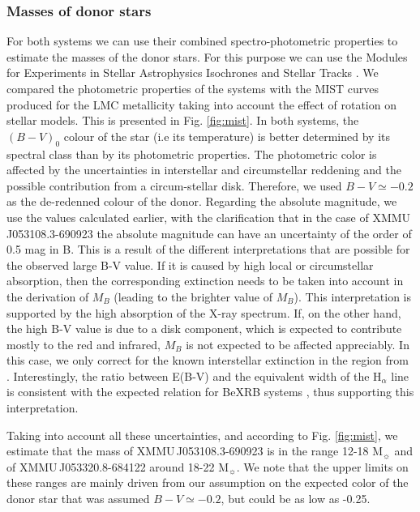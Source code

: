 \documentclass[a4paper,fleqn,usenatbib]{mnras}
\newcommand{\canda}{XMMU\,J053108.3-690923\xspace} %
\newcommand{\candb}{XMMU\,J053320.8-684122\xspace} %
\begin{document}
\subsubsection{Masses of donor stars}
For both systems we can use their combined spectro-photometric properties to estimate the masses of the donor stars.
For this purpose we can use the Modules for Experiments in Stellar Astrophysics \citep[MESA;][]{2011ApJS..192....3P} Isochrones and Stellar Tracks \citep[MIST][]{2016ApJ...823..102C,2016ApJS..222....8D}. 
We compared the photometric properties of the systems with the MIST curves produced for the LMC metallicity taking into account the effect of rotation on stellar models. This is presented in Fig. \ref{fig:mist}. 
In both systems, the $(B-V)_0$ colour of the star (i.e its temperature) is better determined by its spectral class than by its photometric properties. 
The photometric color is affected by the uncertainties in interstellar and circumstellar reddening and the possible contribution from a circum-stellar disk.
Therefore, we used $B-V\simeq-0.2$ as the de-redenned colour of the donor.
Regarding the absolute magnitude, we use the values calculated earlier, with the clarification that in the case of \canda the absolute magnitude can have an uncertainty of the order of 0.5 mag in B. This is a result of the different interpretations that are possible for the observed large B-V value. If it is caused by high local or circumstellar absorption, then the corresponding extinction needs to be taken into account in the derivation of $M_B$ (leading to the brighter value of $M_B$).  This interpretation is supported by the high absorption of the X-ray spectrum.  If, on the other hand, the high B-V value is due to a disk component, which is expected to contribute mostly to the red and infrared, $M_B$ is not expected to be affected appreciably. In this case, we only correct for the known interstellar extinction in the region from \citet{2011AJ....141..158H}. Interestingly,  the ratio between E(B-V) and the equivalent width of the H$_{\alpha}$ line is consistent with the expected relation for BeXRB systems \citep{2012A&A...539A.114R}, thus supporting this interpretation.

Taking into account all these uncertainties, and according to Fig. \ref{fig:mist}, we estimate that the mass of \canda is in the range 12-18 M$_{\sun}$ and of \candb around 18-22 M$_{\sun}$. We note that the upper limits on these ranges are mainly driven from our assumption on the expected color of the donor star that was assumed $B-V\simeq-0.2$, but could be as low as -0.25. 
\end{document}
